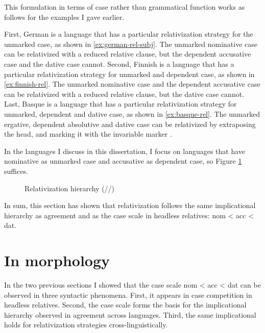 This formulation in terms of case rather than grammatical function works as follows for the examples I gave earlier.

First, German is a language that has a particular relativization strategy for the unmarked case, as shown in \ref{ex:german-rel-subj}. The unmarked nominative case can be relativized with a reduced relative clause, but the dependent accusative case and the dative case cannot.
Second, Finnish is a language that has a particular relativization strategy for unmarked and dependent case, as shown in \ref{ex:finnish-rel}. The unmarked nominative case and the dependent accusative case can be relativized with a reduced relative clause, but the dative case cannot.
Last, Basque is a language that has a particular relativization strategy for unmarked, dependent and dative case, as shown in \ref{ex:basque-rel}. The unmarked ergative, dependent absolutive and dative case can be relativized by extraposing the head, and marking it with the invariable marker .

In the languages I discuss in this dissertation, I focus on languages that have nominative as unmarked case and accusative as dependent case, so Figure \ref{fig:rel-nom-acc-dat} suffices.

\begin{figure}[H]
  \centering
  \caption{Relativization hierarchy (//)}
  \label{fig:rel-nom-acc-dat}
\end{figure}

In sum, this section has shown that relativization follows the same implicational hierarchy as agreement and as the case scale in headless relatives: \ac{nom} < \ac{acc} < \ac{dat}.


\section{In morphology}\label{sec:case-morphology}

In the two previous sections I showed that the case scale \ac{nom} < \ac{acc} < \ac{dat} can be observed in three syntactic phenomena. First, it appears in case competition in headless relatives. Second, the case scale forms the basis for the implicational hierarchy observed in agreement across languages. Third, the same implicational holds for relativization strategies cross-linguistically.

